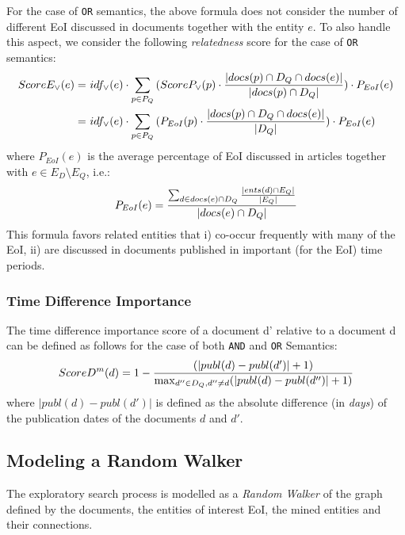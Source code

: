 \documentclass{article}
\begin{document}
For the case of {\tt OR} semantics,
the above formula does not consider the
number of different EoI discussed in documents together with the entity $e$.
To also handle this aspect,
we consider the following {\em relatedness} score
for the case of {\tt OR} semantics:
\begin{equation}
\begin{split}
\small
ScoreE_\vee(e) =  & ~ idf_\vee(e) \cdot \sum_{p \in P_Q}{(ScoreP_\vee(p) \cdot \frac{|docs(p) \cap D_Q \cap docs(e)|}{|docs(p) \cap D_Q|})} \cdot P_{EoI}(e)\\
= & ~ idf_\vee(e) \cdot \sum_{p \in P_Q}{(P_{EoI}(p) \cdot \frac{|docs(p) \cap D_Q \cap docs(e)|}{|D_Q|})} \cdot P_{EoI}(e)
\end{split}
\end{equation}
where $P_{EoI}(e)$ is
the average percentage of EoI discussed in articles together with $e \in E_D \setminus E_Q$, i.e.:
\begin{equation}
\small
P_{EoI}(e) =  \frac{\sum_{d \in docs(e) \cap D_Q}{\frac{|ents(d) \cap E_Q|}{|E_Q|}}}{|docs(e) \cap D_Q|}
\end{equation}
This formula favors related entities that
i)  co-occur frequently with many of the EoI,
ii) are discussed in documents published in important (for the EoI) time periods.

\subsubsection*{Time Difference Importance}

The time difference importance score of a document d' relative to a document d 
can be defined as follows for the case of both {\tt AND} and {\tt OR} Semantics: 
\begin{equation}
\begin{split}
\small
ScoreD^m(d) = 1 - \frac{(|publ(d)-publ(d')|+1)}{\max_{d'' \in D_Q, d'' \neq d}(|publ(d)-publ(d'')|+1)}
\end{split}
\end{equation}
where $|publ(d)-publ(d')|$ is defined as the absolute difference (in {\em days}) 
of the publication dates of the documents $d$ and $d'$.




\subsection{Modeling a Random Walker}
The exploratory search process is modelled as a {\em Random Walker} of the graph 
defined by the documents, the entities of interest EoI, the mined entities and 
their connections. 
\end{document}
